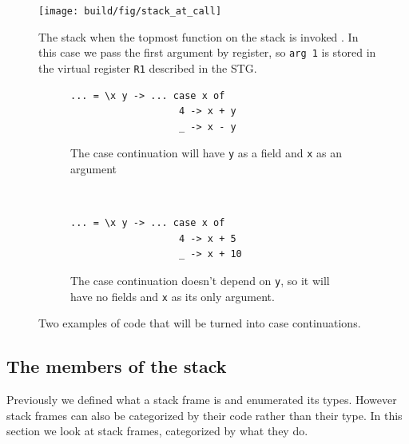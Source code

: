 \begin{figure}
\begin{mdframed}
  \texttt{[image: build/fig/stack\_at\_call]}
  \caption{The stack when the topmost function on the stack is invoked .
In this case we pass the first argument by register, so \texttt{arg 1}
is stored in the virtual register \texttt{R1} described in the STG.}
  \label{fig:stack_at_call}
\end{mdframed}
\end{figure}

\begin{figure}
\begin{mdframed}
        \begin{subfigure}[t]{0.5\textwidth}
          \begin{verbatim}
... = \x y -> ... case x of
                   4 -> x + y
                   _ -> x - y
          \end{verbatim}
          \caption{The case continuation will have \texttt{y} as a field
and \texttt{x} as an argument}
        \end{subfigure}
    ~ %
        \begin{subfigure}[t]{0.5\textwidth}
          \begin{verbatim}
... = \x y -> ... case x of
                   4 -> x + 5
                   _ -> x + 10
          \end{verbatim}
          \caption{The case continuation doesn't depend on \texttt{y}, so it
            will have no fields and \texttt{x} as its only argument.}
          \label{fig:no_fields}
        \end{subfigure}
  \caption{Two examples of code that will be turned into case
continuations.}
  \label{fig:field_and_arguments}
\end{mdframed}
\end{figure}

\subsection{The members of the stack} \label{sec:members_of_stack}


Previously we defined what a stack frame is and enumerated
its types. However stack frames can also be categorized by their
code rather than their type. In this
section we look at stack frames, categorized by what they do.

